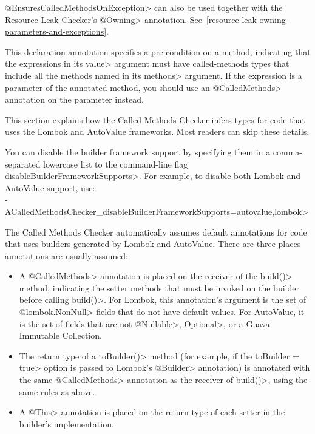 \begin{description}
  \<@EnsuresCalledMethodsOnException> can also be used together with the Resource Leak Checker's
  \<@Owning> annotation.  See~\ref{resource-leak-owning-parameters-and-exceptions}.

\item[\refqualclass{checker/calledmethods/qual}{RequiresCalledMethods}]
  This declaration annotation specifies a pre-condition on a method, indicating that the expressions
  in its \<value> argument must have called-methods types that include all the methods named
  in its \<methods> argument. If the expression is a parameter of the annotated method, you should
  use an \<@CalledMethods> annotation on the parameter instead.

\end{description}


This section explains how the Called Methods Checker infers types for code
that uses the Lombok and AutoValue frameworks. Most readers can skip these
details.

You can disable the builder framework support by specifying them in a
comma-separated lowercase list to the command-line flag
\<disableBuilderFrameworkSupports>.  For example, to disable both Lombok
and AutoValue support, use: \\
\<-ACalledMethodsChecker\_disableBuilderFrameworkSupports=autovalue,lombok>

The Called Methods Checker automatically assumes default annotations for code that uses builders generated
by Lombok and AutoValue. There are three places annotations are usually assumed:
\begin{itemize}
\item A \<@CalledMethods> annotation is placed on the receiver of the
  \<build()> method, indicating the setter methods that must be invoked on
  the builder before calling \<build()>. For Lombok, this annotation's
  argument is the set of \<@lombok.NonNull> fields that do not have default
  values.  For AutoValue, it is the set of fields that are not
  \<@Nullable>, \<Optional>, or a Guava Immutable Collection.
\item The return type of a \<toBuilder()> method (for example, if the
  \<toBuilder = true> option is passed to Lombok's \<@Builder> annotation)
  is annotated with the same \<@CalledMethods> annotation as the receiver
  of \<build()>, using the same rules as above.
\item A \<@This> annotation is placed on the return type of each setter in
  the builder's implementation.
\end{itemize}

